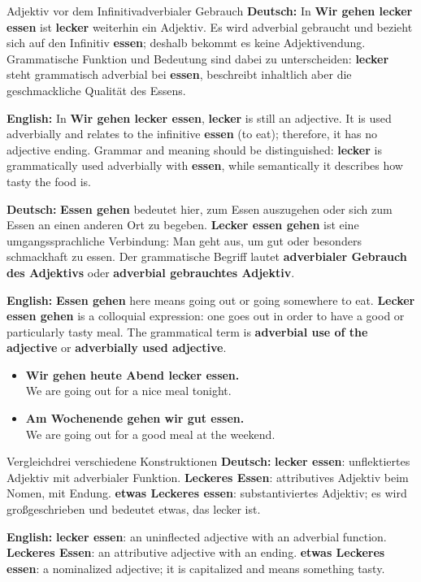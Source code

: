 \documentclass[a4paper,11pt]{article}
\newcommand{\GermanText}[1]{\textbf{Deutsch: }#1\par}
\newcommand{\EnglishText}[1]{{\small\color{SoftGray}\textbf{English: }#1\par}}
\newcommand{\ExampleItem}[2]{\item \textbf{#1}\\{\small\color{SoftGray}#2}}
\begin{document}
        \begin{grammarentry}{Adjektiv vor dem Infinitiv}{adverbialer Gebrauch}
            \GermanText{In \textbf{Wir gehen lecker essen} ist \textbf{lecker} weiterhin ein Adjektiv. Es wird adverbial gebraucht und bezieht sich auf den Infinitiv \textbf{essen}; deshalb bekommt es keine Adjektivendung. Grammatische Funktion und Bedeutung sind dabei zu unterscheiden: \textbf{lecker} steht grammatisch adverbial bei \textbf{essen}, beschreibt inhaltlich aber die geschmackliche Qualität des Essens.}
            \EnglishText{In \textbf{Wir gehen lecker essen}, \textbf{lecker} is still an adjective. It is used adverbially and relates to the infinitive \textbf{essen} (to eat); therefore, it has no adjective ending. Grammar and meaning should be distinguished: \textbf{lecker} is grammatically used adverbially with \textbf{essen}, while semantically it describes how tasty the food is.}

            \GermanText{\textbf{Essen gehen} bedeutet hier, zum Essen auszugehen oder sich zum Essen an einen anderen Ort zu begeben. \textbf{Lecker essen gehen} ist eine umgangssprachliche Verbindung: Man geht aus, um gut oder besonders schmackhaft zu essen. Der grammatische Begriff lautet \textbf{adverbialer Gebrauch des Adjektivs} oder \textbf{adverbial gebrauchtes Adjektiv}.}
            \EnglishText{\textbf{Essen gehen} here means going out or going somewhere to eat. \textbf{Lecker essen gehen} is a colloquial expression: one goes out in order to have a good or particularly tasty meal. The grammatical term is \textbf{adverbial use of the adjective} or \textbf{adverbially used adjective}.}
        \end{grammarentry}

        \begin{exbox}
            \begin{itemize}
                \ExampleItem{Wir gehen heute Abend lecker essen.}{We are going out for a nice meal tonight.}
                \ExampleItem{Am Wochenende gehen wir gut essen.}{We are going out for a good meal at the weekend.}
            \end{itemize}
        \end{exbox}

        \begin{grammarentry}{Vergleich}{drei verschiedene Konstruktionen}
            \GermanText{\textbf{lecker essen}: unflektiertes Adjektiv mit adverbialer Funktion. \textbf{Leckeres Essen}: attributives Adjektiv beim Nomen, mit Endung. \textbf{etwas Leckeres essen}: substantiviertes Adjektiv; es wird großgeschrieben und bedeutet \glqq etwas, das lecker ist\grqq{}.}
            \EnglishText{\textbf{lecker essen}: an uninflected adjective with an adverbial function. \textbf{Leckeres Essen}: an attributive adjective with an ending. \textbf{etwas Leckeres essen}: a nominalized adjective; it is capitalized and means something tasty.}
        \end{grammarentry}
\end{document}
